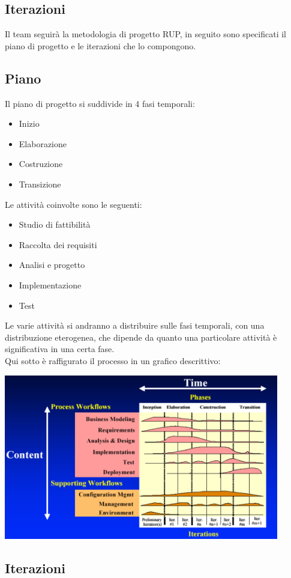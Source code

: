 \subsection{Iterazioni}
Il team seguirà la metodologia di progetto RUP, in seguito sono specificati il piano di progetto e le
iterazioni che lo compongono.

\subsection{Piano}
Il piano di progetto si suddivide in 4 fasi temporali:
\begin{itemize}
    \item Inizio
    \item Elaborazione
    \item Costruzione
    \item Transizione
\end{itemize}
Le attività coinvolte sono le seguenti:
\begin{itemize}
    \item Studio di fattibilità
    \item Raccolta dei requisiti
    \item Analisi e progetto
    \item Implementazione
    \item Test
\end{itemize}
Le varie attività si andranno a distribuire sulle fasi temporali, con una distribuzione eterogenea, che
dipende da quanto una particolare attività è significativa in una certa fase.\\
Qui sotto è raffigurato il processo in un grafico descrittivo:

\includegraphics[width=12cm]{images/RUPplan.png}

\subsection{Iterazioni}